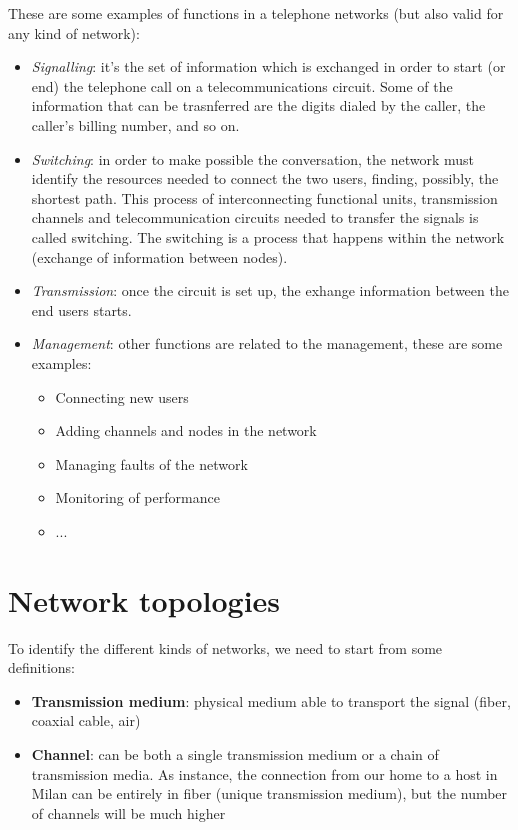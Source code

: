 \noindent These are some examples of functions in a telephone networks (but also valid for any kind of network):
\begin{itemize}
    \item \textit{Signalling}: it's the set of information which is exchanged in order to start (or end) the telephone call on a telecommunications circuit. Some of the information that can be trasnferred are the digits dialed by the caller, the caller's billing number, and so on.
    \item \textit{Switching}: in order to make possible the conversation, the network must identify the resources needed to connect the two users, finding, possibly, the shortest path. This process of interconnecting functional units, transmission channels and telecommunication circuits needed to transfer the signals is called switching. The switching is a process that happens within the network (exchange of information between nodes).
    \item \textit{Transmission}: once the circuit is set up, the exhange information between the end users starts.
    \item \textit{Management}: other functions are related to the management, these are some examples:
    \begin{itemize}
        \item Connecting new users
        \item Adding channels and nodes in the network
        \item Managing faults of the network
        \item Monitoring of performance
        \item ...
    \end{itemize}
\end{itemize}

\section{Network topologies}
To identify the different kinds of networks, we need to start from some definitions:
\begin{itemize}
    \item \textbf{Transmission medium}: physical medium able to transport the signal (fiber, coaxial cable, air)
    \item \textbf{Channel}: can be both a single transmission medium or a chain of transmission media. As instance, the connection from our home to a host in Milan can be entirely in fiber (unique transmission medium), but the number of channels will be much higher
\end{itemize}

